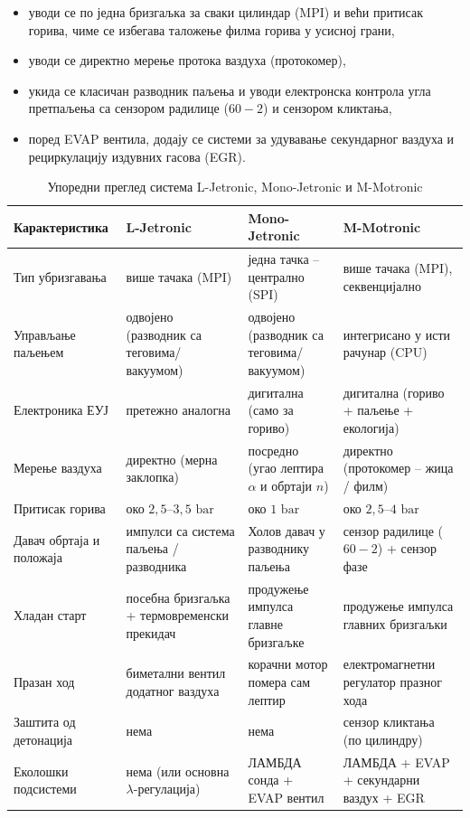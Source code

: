 \documentclass[12pt]{article}
\begin{document}
\begin{itemize}[noitemsep]
    \item уводи се по једна бризгаљка за сваки цилиндар (MPI) и већи притисак
          горива, чиме се избегава таложење филма горива у усисној грани,
    \item уводи се директно мерење протока ваздуха (протокомер),
    \item укида се класичан разводник паљења и уводи електронска контрола
          угла претпаљења са сензором радилице ($60-2$) и сензором кликтања,
    \item поред EVAP вентила, додају се системи за удувавање секундарног
          ваздуха и рециркулацију издувних гасова (EGR).
\end{itemize}

\begin{table}[H]
    \centering
    \footnotesize
    \renewcommand{\arraystretch}{1.3}
    \begin{tabular}{p{2.7cm} p{3.3cm} p{3.3cm} p{3.7cm}}
        \toprule
        \textbf{Карактеристика} & \textbf{L-Jetronic} & \textbf{Mono-Jetronic} & \textbf{M-Motronic} \\
        \midrule
        Тип убризгавања & више тачака (MPI) & једна тачка -- централно (SPI) & више тачака (MPI), секвенцијално \\
        \midrule
        Управљање паљењем & одвојено (разводник са теговима/вакуумом) & одвојено (разводник са теговима/вакуумом) & интегрисано у исти рачунар (CPU) \\
        \midrule
        Електроника ЕУЈ & претежно аналогна & дигитална (само за гориво) & дигитална (гориво + паљење + екологија) \\
        \midrule
        Мерење ваздуха & директно (мерна заклопка) & посредно (угао лептира $\alpha$ и обртаји $n$) & директно (протокомер -- жица / филм) \\
        \midrule
        Притисак горива & око $2{,}5\text{--}3{,}5\text{ bar}$ & око $1\text{ bar}$ & око $2{,}5\text{--}4\text{ bar}$ \\
        \midrule
        Давач обртаја и положаја & импулси са система паљења / разводника & Холов давач у разводнику паљења & сензор радилице ($60-2$) + сензор фазе \\
        \midrule
        Хладан старт & посебна бризгаљка + термовременски прекидач & продужење импулса главне бризгаљке & продужење импулса главних бризгаљки \\
        \midrule
        Празан ход & биметални вентил додатног ваздуха & корачни мотор помера сам лептир & електромагнетни регулатор празног хода \\
        \midrule
        Заштита од детонација & нема & нема & сензор кликтања (по цилиндру) \\
        \midrule
        Еколошки подсистеми & нема (или основна $\lambda$-регулација) & ЛАМБДА сонда + EVAP вентил & ЛАМБДА + EVAP + секундарни ваздух + EGR \\
        \bottomrule
    \end{tabular}
    \caption{Упоредни преглед система L-Jetronic, Mono-Jetronic и M-Motronic}
\end{table}
\end{document}
